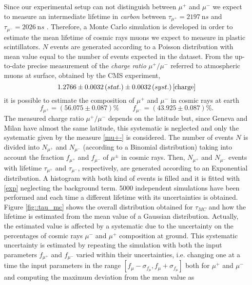 Since our experimental setup can not distinguish between $\mu^+$ and $\mu^-$ we expect to measure an intermediate lifetime in \emph{carbon} between $\tau_{\mu^+} = \SI{2197}{\nano s}$ and $\tau_{\mu^-} = \SI{2026}{\nano s}$ \cite{lifetime}.
Therefore, a Monte Carlo simulation is developed in order to estimate the mean lifetime of cosmic rays muons we expect to measure in plastic scintillators.
$N$ events are generated  according to a Poisson distribution with mean value equal to the number of events expected in the dataset.
From the up-to-date precise measurement of the \emph{charge ratio} $\mu^+ / \mu^-$ referred to atmospheric muons at surface, obtained by the CMS experiment,
\begin{equation} \label{mu+-}
1.2766 \pm 0.0032 \, (stat.) \pm 0.0032 \,(syst.) \, \cite{charge}
\end{equation}  
it is possible to estimate the composition of $\mu^+$ and $\mu^-$ in cosmic rays at earth
\begin{equation}
f_{\mu^+} =  ( 56.075 \pm 0.087 ) \% \qquad f_{\mu^-} =  ( 43.925 \pm 0.087 ) \% .
\end{equation}
The measured charge ratio $\mu^{+} / \mu^{-}$ depends on the latitude but, since Geneva and Milan have almost the same latitude, this systematic is neglected and only the systematic given by the measure \ref{mu+-} is considered.
The number of events $N$ is divided into $N_{\mu^+}$ and $N_{\mu^-}$ (according to a Binomial distribution) taking into account the fraction $f_{\mu^+}$ and $f_{\mu^-}$ of $\mu^{\pm}$ in cosmic rays. Then, $N_{\mu^+}$ and $N_{\mu^-}$ events with lifetime $\tau_{\mu^+}$ and $\tau_{\mu^-}$, respectively, are generated according to an Exponential distribution.
A histogram with both kind of events is filled and it is fitted with \eqref{exp} neglecting the background term.
5000 independent simulations have been performed and each time a different lifetime with its uncertainties is obtained.
Figure \ref{fig::tau_mc} shows the overall distribution obtained for $\tau_{MC}$ and how the lifetime is estimated from the mean value of a Gaussian distribution.
Actually, the estimated value is affected by a systematic due to the uncertainty on the percentages of cosmic rays $\mu^-$ and $\mu^+$ composition at ground. This systematic uncertainty is estimated by repeating the simulation with both the input parameters $f_{\mu^+}$ and $f_{\mu^-}$ varied within their uncertainties, i.e. changing one at a time the input parameters in the range $[ f_{\mu} - \sigma_{f_{\mu}}, f_{\mu} + \sigma_{f_{\mu}}]$ both for $\mu^+$ and $\mu^-$ and computing the maximum deviation from the mean value as

